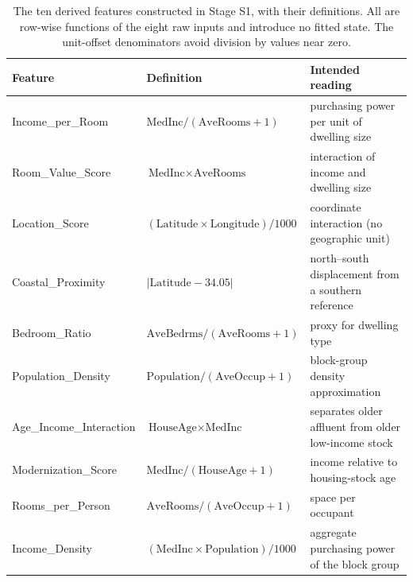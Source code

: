 \begin{table}[htbp]
\centering
\caption{The ten derived features constructed in Stage S1, with their definitions. All are row-wise functions of the eight raw inputs and introduce no fitted state. The unit-offset denominators avoid division by values near zero.}\label{tab:derived}
\small
\begin{tabular}{lll}
\toprule
Feature & Definition & Intended reading \\
\midrule
Income\_per\_Room & $\text{MedInc} / (\text{AveRooms} + 1)$ & purchasing power per unit of dwelling size \\
Room\_Value\_Score & $\text{MedInc} \times \text{AveRooms}$ & interaction of income and dwelling size \\
Location\_Score & $(\text{Latitude} \times \text{Longitude})/1000$ & coordinate interaction (no geographic unit) \\
Coastal\_Proximity & $|\text{Latitude} - 34.05|$ & north--south displacement from a southern reference \\
Bedroom\_Ratio & $\text{AveBedrms} / (\text{AveRooms} + 1)$ & proxy for dwelling type \\
Population\_Density & $\text{Population} / (\text{AveOccup} + 1)$ & block-group density approximation \\
Age\_Income\_Interaction & $\text{HouseAge} \times \text{MedInc}$ & separates older affluent from older low-income stock \\
Modernization\_Score & $\text{MedInc} / (\text{HouseAge} + 1)$ & income relative to housing-stock age \\
Rooms\_per\_Person & $\text{AveRooms} / (\text{AveOccup} + 1)$ & space per occupant \\
Income\_Density & $(\text{MedInc} \times \text{Population})/1000$ & aggregate purchasing power of the block group \\
\bottomrule
\end{tabular}
\end{table}
